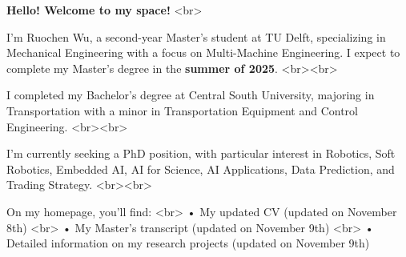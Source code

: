 \textbf{Hello! Welcome to my space!} <br>

I’m Ruochen Wu, a second-year Master's student at TU Delft, specializing in Mechanical Engineering with a focus on Multi-Machine Engineering. I expect to complete my Master's degree in the \textbf{summer of 2025}. <br><br>

I completed my Bachelor’s degree at Central South University, majoring in Transportation with a minor in Transportation Equipment and Control Engineering. <br><br>

I’m currently seeking a PhD position, with particular interest in Robotics, Soft Robotics, Embedded AI, AI for Science, AI Applications, Data Prediction, and Trading Strategy. <br><br>

On my homepage, you’ll find: <br>
• My updated CV (updated on November 8th) <br>
• My Master’s transcript (updated on November 9th) <br>
• Detailed information on my research projects (updated on November 9th)
